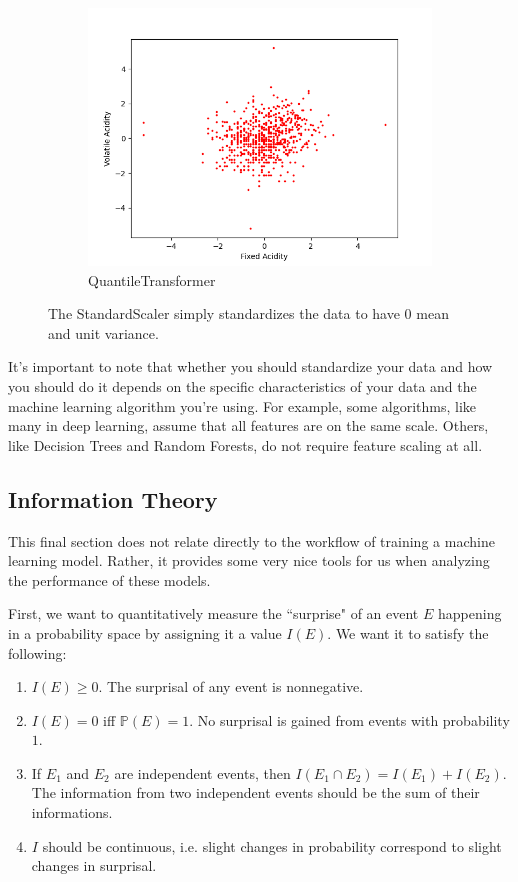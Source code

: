 \documentclass{article}
\theoremstyle{definition}
\theoremstyle{remark}
\theoremstyle{definition}
\begin{document}
\begin{figure}[hbt!]
\begin{subfigure}[b]{0.32\textwidth}
            \includegraphics[width=\textwidth]{Standardize/Quantile_Scaler.png}
            \caption{QuantileTransformer}
            \label{fig:d}
        \end{subfigure}
        
        \caption{The StandardScaler simply standardizes the data to have $0$ mean and unit variance.}
        \label{Scalers}
    \end{figure}

It's important to note that whether you should standardize your data and how you should do it depends on the specific characteristics of your data and the machine learning algorithm you're using. For example, some algorithms, like many in deep learning, assume that all features are on the same scale. Others, like Decision Trees and Random Forests, do not require feature scaling at all. 


\subsection{Information Theory}

This final section does not relate directly to the workflow of training a machine learning model. Rather, it provides some very nice tools for us when analyzing the performance of these models. 

First, we want to quantitatively measure the ``surprise" of an event $E$ happening in a probability space by assigning it a value $I(E)$. We want it to satisfy the following: 
\begin{enumerate}
    \item $I(E) \geq 0$. The surprisal of any event is nonnegative. 
    \item $I(E) = 0$ iff $\mathbb{P}(E) = 1$. No surprisal is gained from events with probability $1$. 
    \item If $E_1$ and $E_2$ are independent events, then $I(E_1 \cap E_2) = I(E_1) + I(E_2)$. The information from two independent events should be the sum of their informations. 
    \item $I$ should be continuous, i.e. slight changes in probability correspond to slight changes in surprisal. 
\end{enumerate}
\end{document}

